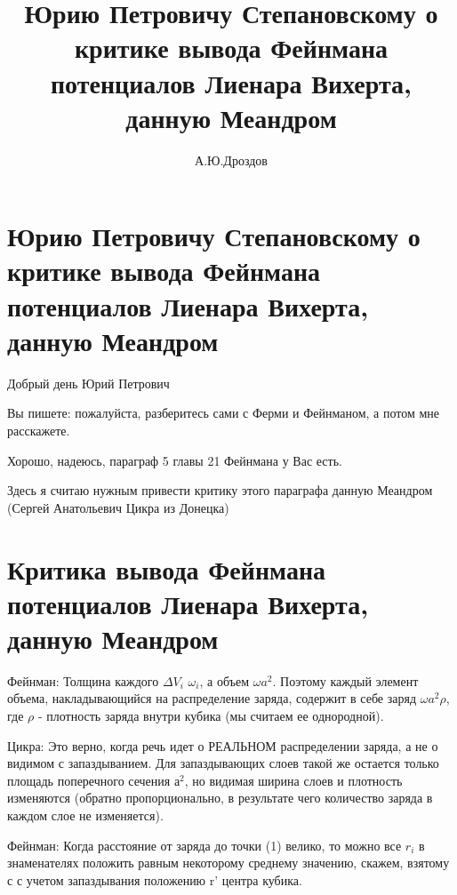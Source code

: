 \documentclass{article}
\begin{document}
\title{Юрию Петровичу Степановскому о критике вывода Фейнмана потенциалов Лиенара Вихерта, данную Меандром}

\author{А.Ю.Дроздов}



\begin{titlepage}
\maketitle
\end{titlepage}


\section{Юрию Петровичу Степановскому о критике вывода Фейнмана потенциалов Лиенара Вихерта, данную Меандром}

Добрый день Юрий Петрович

Вы пишете:  пожалуйста, разберитесь сами с Ферми и Фейнманом, а потом мне расскажете.

Хорошо, надеюсь, параграф 5 главы 21 Фейнмана \cite{Feinman} у Вас есть.

Здесь я считаю нужным привести критику этого параграфа данную Меандром (Сергей Анатольевич Цикра из Донецка) \cite{meandr}

\section{Критика вывода Фейнмана потенциалов Лиенара Вихерта, данную Меандром}


Фейнман:
Толщина каждого $\Delta V_i$   $\omega_i$, а объем  $\omega a^2$.
Поэтому каждый элемент объема, накладывающийся на распределение заряда, содержит в себе заряд $\omega a^2\rho$, где $\rho$ - плотность заряда внутри кубика (мы считаем ее однородной).


Цикра:
Это верно, когда речь идет о РЕАЛЬНОМ распределении заряда, а не о видимом с запаздыванием. Для запаздывающих слоев такой же остается только площадь поперечного сечения $а^2$, но видимая ширина слоев и плотность изменяются (обратно пропорционально, в результате чего количество заряда в каждом слое не изменяется).

Фейнман:
Когда расстояние от заряда до точки (1) велико, то можно все $r_i$ в знаменателях положить равным некоторому среднему значению, скажем, взятому с с учетом запаздывания положению r' центра кубика.
\end{document}
